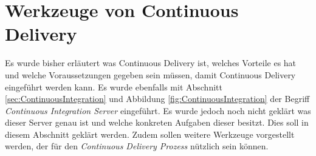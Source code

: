 \section{Werkzeuge von Continuous Delivery}
\label{sec:WerkzeugeCD}
Es wurde bisher erläutert was Continuous Delivery ist, welches Vorteile es hat und welche Voraussetzungen gegeben sein müssen, damit Continuous Delivery eingeführt werden kann. Es wurde ebenfalls mit Abschnitt \ref{sec:ContinuousIntegration}  und Abbildung \ref{fig:ContinuousIntegration}  der Begriff \textit{Continuous Integration Server} eingeführt. Es wurde jedoch noch nicht geklärt was dieser Server genau ist und welche konkreten Aufgaben dieser besitzt. Dies soll in diesem Abschnitt geklärt werden. Zudem sollen weitere Werkzeuge vorgestellt werden, der für den \textit{Continuous Delivery Prozess} nützlich sein können.

